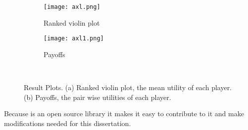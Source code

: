 \begin{figure}[h]
\centering
    \begin{subfigure}[t]{0.55\textwidth}
    \centering
        \texttt{[image: axl.png]}
    \caption{Ranked violin plot}
    \end{subfigure}
\hfill
    \begin{subfigure}[t]{0.50\textwidth}\centering
    \centering
        \texttt{[image: axl1.png]}
    \caption{Payoffs}
    \end{subfigure}
~
\caption{Result Plots. (a) Ranked violin plot, the mean utility of each player.
(b) Payoffs, the pair wise utilities of each player.}
\label{fig:axelrodplots}
\end{figure}

Because is an open source library it makes it easy to contribute to it and
make modifications needed for this dissertation.


